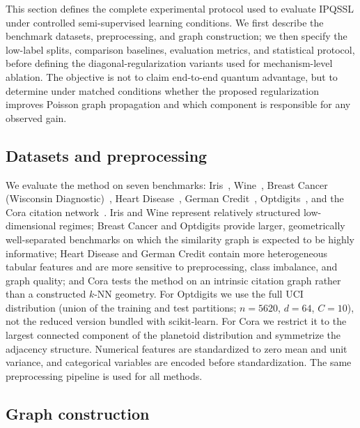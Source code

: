 \documentclass[11pt,a4paper]{article}
\begin{document}
This section defines the complete experimental protocol used to evaluate
\textsc{IPQSSL} under controlled semi-supervised learning conditions. We first
describe the benchmark datasets, preprocessing, and graph construction; we then
specify the low-label splits, comparison baselines, evaluation metrics, and
statistical protocol, before defining the diagonal-regularization variants used
for mechanism-level ablation. The objective is not to claim end-to-end quantum
advantage, but to determine under matched conditions whether the proposed
regularization improves Poisson graph propagation and which component is
responsible for any observed gain.

\subsection{Datasets and preprocessing}
\label{subsec:datasets}
We evaluate the method on seven benchmarks: Iris~\cite{fisher1988},
Wine~\cite{AeberhardForina1991Wine}, Breast Cancer (Wisconsin
Diagnostic)~\cite{wolberg1995breast}, Heart
Disease~\cite{misc_heart_disease_45}, German Credit~\cite{hofmann1994},
Optdigits~\cite{alpaydin1998optdigits}, and the Cora citation
network~\cite{sen2008collective,yang2016revisiting}. Iris and Wine
represent relatively structured low-dimensional regimes; Breast Cancer and
Optdigits provide larger, geometrically well-separated benchmarks on which
the similarity graph is expected to be highly informative; Heart Disease
and German Credit contain more heterogeneous tabular features and are more
sensitive to preprocessing, class imbalance, and graph quality; and Cora
tests the method on an intrinsic citation graph rather than a constructed
$k$-NN geometry. For Optdigits we use the full UCI distribution (union of
the training and test partitions; $n=5620$, $d=64$, $C=10$), not the
reduced version bundled with scikit-learn.
For Cora we restrict it to the largest connected component of the planetoid
distribution and symmetrize the adjacency structure. Numerical features
are standardized to zero mean and unit variance, and categorical variables
are encoded before standardization. The same preprocessing pipeline is
used for all methods.

\subsection{Graph construction}
\label{subsec:graph_construction}
\end{document}
